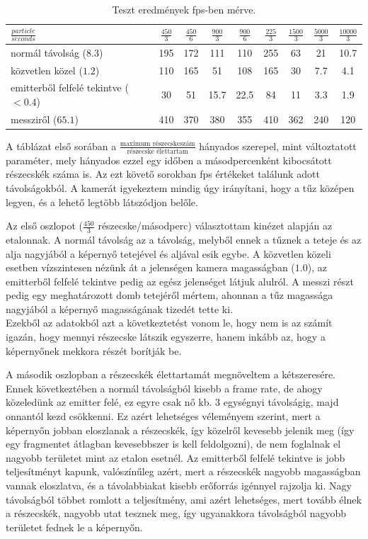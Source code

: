 \begin{table}[h!]
\centering
\begin{tabular}{ m{10em}|c|c|c|c|c|c|c|c| } 
 $\frac{particle}{seconds}$ & $\frac{450}{3}$ & $\frac{450}{6}$ & $\frac{900}{3}$ & $\frac{900}{6}$ & $\frac{225}{3}$ & $\frac{1500}{3}$ & $\frac{5000}{3}$ & $\frac{10000}{3}$ \\  \hline
 
 normál távolság ($8.3$) & 195 & 172 & 111 & 110 & 255 & 63 & 21 & 10.7\\  \hline
 közvetlen közel ($1.2$) & 110 & 165 & 51 & 108 & 165 & 30 & 7.7 & 4.1\\  \hline
 emitterből felfelé tekintve ($<0.4$) & 30 &  51 & 15.7 & 22.5 & 84 & 11 & 3.3 & 1.9\\ \hline
 messziről ($65.1$) & 410 &  370 & 380 & 355 & 410 & 362 & 240 & 120\\ 
 \hline
\end{tabular}
\caption{Teszt eredmények fps-ben mérve.}
\label{table:1}
\end{table}

A táblázat első sorában a $\frac{\text{maximum részecskeszám}}{\text{részecske élettartam}}$ hányados szerepel, mint változtatott paraméter, mely hányados ezzel egy időben a másodpercenként kibocsátott részecskék száma is. Az ezt követő sorokban fps értékeket találunk adott távolságokból. A kamerát igyekeztem mindig úgy irányítani, hogy a tűz középen legyen, és a lehető legtöbb látszódjon belőle.

Az első oszlopot ($\frac{450}{3}$ részecske/másodperc) választottam kinézet alapján az etalonnak. A normál távolság az a távolság, melyből ennek a tűznek a teteje és az alja nagyjából a képernyő tetejével és aljával esik egybe. A közvetlen közeli esetben vízszintesen nézünk át a jelenségen kamera magasságban ($1.0$), az emitterből felfelé tekintve pedig az egész jelenséget látjuk alulról. A messzi részt pedig egy meghatározott domb tetejéről mértem, ahonnan a tűz magassága nagyjából a képernyő magasságának tizedét tette ki.\\
Ezekből az adatokból azt a következtetést vonom le, hogy nem is az számít igazán, hogy mennyi részecske látszik egyszerre, hanem inkább az, hogy a képernyőnek mekkora részét borítják be.

A második oszlopban a részecskék élettartamát megnöveltem a kétszeresére. Ennek következtében a normál távolságból kisebb a frame rate, de ahogy közeledünk az emitter felé, ez egyre csak nő kb. 3 egységnyi távolságig, majd onnantól kezd csökkenni. Ez azért lehetséges véleményem szerint, mert a képernyőn jobban eloszlanak a részecskék, így közelről kevesebb jelenik meg (így egy fragmentet átlagban kevesebbszer is kell feldolgozni), de nem foglalnak el nagyobb területet mint az etalon esetnél. Az emitterből felfelé tekintve is jobb teljesítményt kapunk, valószínűleg azért, mert a részecskék nagyobb magasságban vannak eloszlatva, és a távolabbiakat kisebb erőforrás igénnyel rajzolja ki. Nagy távolságból többet romlott a teljesítmény, ami azért lehetséges, mert tovább élnek a részecskék, nagyobb utat tesznek meg, így ugyanakkora távolságból nagyobb területet fednek le a képernyőn.

